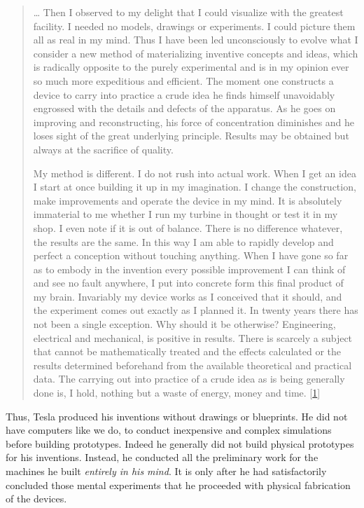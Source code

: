 \documentclass[
  a4paper,
]{article}
\begin{document}
\begin{quote}
\ldots{} Then I observed to my delight that I could visualize with the
greatest facility. I needed no models, drawings or experiments. I could
picture them all as real in my mind. Thus I have been led unconsciously
to evolve what I consider a new method of materializing inventive
concepts and ideas, which is radically opposite to the purely
experimental and is in my opinion ever so much more expeditious and
efficient. The moment one constructs a device to carry into practice a
crude idea he finds himself unavoidably engrossed with the details and
defects of the apparatus. As he goes on improving and reconstructing,
his force of concentration diminishes and he loses sight of the great
underlying principle. Results may be obtained but always at the
sacrifice of quality.

My method is different. I do not rush into actual work. When I get an
idea I start at once building it up in my imagination. I change the
construction, make improvements and operate the device in my mind. It is
absolutely immaterial to me whether I run my turbine in thought or test
it in my shop. I even note if it is out of balance. There is no
difference whatever, the results are the same. In this way I am able to
rapidly develop and perfect a conception without touching anything. When
I have gone so far as to embody in the invention every possible
improvement I can think of and see no fault anywhere, I put into
concrete form this final product of my brain. Invariably my device works
as I conceived that it should, and the experiment comes out exactly as I
planned it. In twenty years there has not been a single exception. Why
should it be otherwise? Engineering, electrical and mechanical, is
positive in results. There is scarcely a subject that cannot be
mathematically treated and the effects calculated or the results
determined beforehand from the available theoretical and practical data.
The carrying out into practice of a crude idea as is being generally
done is, I hold, nothing but a waste of energy, money and time.
{[}\protect\hyperlink{ref-john83}{1}{]}
\end{quote}

Thus, Tesla produced his inventions without drawings or blueprints. He
did not have computers like we do, to conduct inexpensive and complex
simulations before building prototypes. Indeed he generally did not
build physical prototypes for his inventions. Instead, he conducted all
the preliminary work for the machines he built \emph{entirely in his
mind}. It is only after he had satisfactorily concluded those mental
experiments that he proceeded with physical fabrication of the devices.
\end{document}
